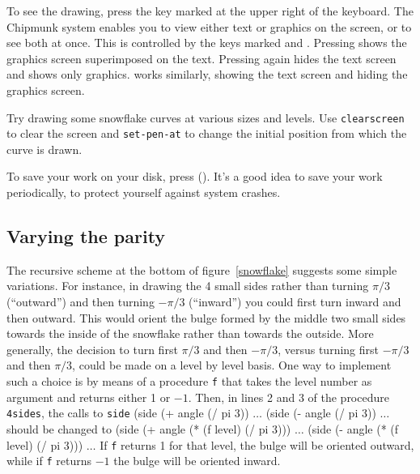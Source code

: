 To see the drawing, press the key marked  at the upper
right of the keyboard.  The Chipmunk system enables you to view either
text or graphics on the screen, or to see both at once.  This is
controlled by the keys marked  and .
Pressing  shows the graphics screen superimposed on the
text.  Pressing  again hides the text screen and shows
only graphics.   works similarly, showing the text screen
and hiding the graphics screen.

Try drawing some snowflake curves at various sizes and levels.  Use
{\tt clearscreen} to clear the screen and {\tt set-pen-at} to change
the initial position from which the curve is drawn.

To save your work on your disk, press { ()}.
It's a good idea to save your work periodically, to protect yourself
against system crashes.

\subsection{Varying the parity}

The recursive scheme at the bottom of figure~\ref{snowflake} suggests
some simple variations.  For instance, in drawing the 4 small sides
rather than turning $\pi/3$ (``outward'') and then turning $-\pi/3$
(``inward'') you could first turn inward and then outward.  This would
orient the bulge formed by the middle two small sides towards the
inside of the snowflake rather than towards the outside.  More
generally, the decision to turn first $\pi/3$ and then $-\pi/3$,
versus turning first $-\pi/3$ and then $\pi/3$, could be made on a
level by level basis.  One way to implement such a choice is by means
of a procedure {\tt f} that takes the level number as argument and
returns either 1 or $-1$.  Then, in lines 2 and 3 of the procedure
{\tt 4sides}, the calls to {\tt side}
\beginlisp
(side (+ angle (/ pi 3)) $\ldots$
(side (- angle (/ pi 3)) $\ldots$
\endlisp
should be changed to
\beginlisp
(side (+ angle (* (f level) (/ pi 3))) $\ldots$
(side (- angle (* (f level) (/ pi 3))) $\ldots$
\endlisp
If {\tt f} returns 1 for that level, the bulge will be oriented
outward, while if {\tt f} returns $-1$ the bulge will be oriented
inward.

